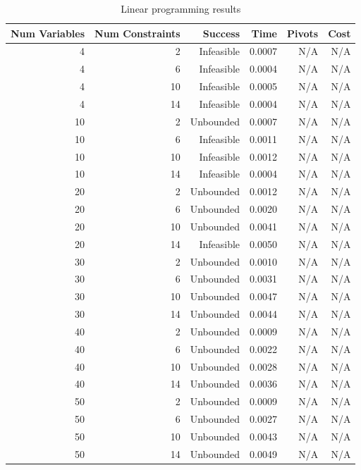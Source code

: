 \begin{table}[ht]
    \centering
    \begin{tabular}{rrrrrr}
        \toprule
        Num Variables & Num Constraints & Success & Time & Pivots & Cost \\
        \midrule
        4 & 2 & Infeasible & 0.0007 & N/A & N/A \\
		4 & 6 & Infeasible & 0.0004 & N/A & N/A \\
		4 & 10 & Infeasible & 0.0005 & N/A & N/A \\
		4 & 14 & Infeasible & 0.0004 & N/A & N/A \\
		10 & 2 & Unbounded & 0.0007 & N/A & N/A \\
		10 & 6 & Infeasible & 0.0011 & N/A & N/A \\
		10 & 10 & Infeasible & 0.0012 & N/A & N/A \\
		10 & 14 & Infeasible & 0.0004 & N/A & N/A \\
		20 & 2 & Unbounded & 0.0012 & N/A & N/A \\
		20 & 6 & Unbounded & 0.0020 & N/A & N/A \\
		20 & 10 & Unbounded & 0.0041 & N/A & N/A \\
		20 & 14 & Infeasible & 0.0050 & N/A & N/A \\
		30 & 2 & Unbounded & 0.0010 & N/A & N/A \\
		30 & 6 & Unbounded & 0.0031 & N/A & N/A \\
		30 & 10 & Unbounded & 0.0047 & N/A & N/A \\
		30 & 14 & Unbounded & 0.0044 & N/A & N/A \\
		40 & 2 & Unbounded & 0.0009 & N/A & N/A \\
		40 & 6 & Unbounded & 0.0022 & N/A & N/A \\
		40 & 10 & Unbounded & 0.0028 & N/A & N/A \\
		40 & 14 & Unbounded & 0.0036 & N/A & N/A \\
		50 & 2 & Unbounded & 0.0009 & N/A & N/A \\
		50 & 6 & Unbounded & 0.0027 & N/A & N/A \\
		50 & 10 & Unbounded & 0.0043 & N/A & N/A \\
		50 & 14 & Unbounded & 0.0049 & N/A & N/A \\
        \bottomrule
    \end{tabular}
    \caption{Linear programming results}
    \label{tab:lp-results}
\end{table}